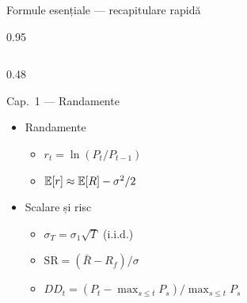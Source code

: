 \documentclass[9pt, aspectratio=169, t]{beamer}
\begin{document}
\begin{frame}[shrink=35]{Formule esențiale --- recapitulare rapidă}
\begin{cminipage}{0.95\textwidth}
\begin{columns}[T]
\begin{column}{0.48\textwidth}
\begin{block}{Cap.~1 --- Randamente}
\small
\begin{itemize}\setlength{\itemsep}{0pt}
    \item Randamente
    \begin{itemize}\setlength{\itemsep}{0pt}
        \item $r_t = \ln(P_t/P_{t-1})$
        \item $\mathbb{E}[r] \approx \mathbb{E}[R] - \sigma^2/2$
    \end{itemize}
    \item Scalare și risc
    \begin{itemize}\setlength{\itemsep}{0pt}
        \item $\sigma_T = \sigma_1\sqrt{T}$ (i.i.d.)
        \item $\text{SR} = (\bar R - R_f)/\sigma$
        \item $DD_t = (P_t - \max_{s \le t} P_s)/\max_{s \le t} P_s$
    \end{itemize}
\end{itemize}
\end{block}


\end{column}
\end{columns}
\end{cminipage}
\end{frame}
\end{document}
